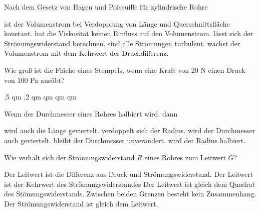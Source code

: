 \documentclass[11pt]{exam}
\begin{document}
\setlength{\voffset}{-0.5in}
\setlength{\headsep}{5pt}

\hspace{2mm}
 \hspace{5mm}
\vspace{4mm}

\begin{questions}

\question Nach dem Gesetz von Hagen und Poiseuille für zylindrische Rohre

\begin{choices}
	\choice ist der Volumenstrom bei Verdopplung von Länge und Querschnittsfläche konstant.
	\choice hat die Viskosität keinen Einfluss auf den Volumenstrom.
	\choice lässt sich der Strömungswiderstand berechnen.
	\choice sind alle Strömungen turbulent.
	\choice wächst der Volumenstrom mit dem Kehrwert der Druckdifferenz.
\end{choices}

\vspace{3mm}\question Wie groß ist die Fläche eines Stempels, wenn eine Kraft von 20 N einen Druck von 100 Pa ausübt?

\begin{choices}
	,5 qm
	,2 qm
	 qm
	 qm
	 qm
\end{choices}

\vspace{3mm}\question Wenn der Durchmesser eines Rohres halbiert wird, dann

\begin{choices}
	\choice wird auch die Länge geviertelt.
	\choice verdoppelt sich der Radius.
	\choice wird der Durchmesser auch geviertelt.
	\choice bleibt der Durchmesser unverändert.
	\choice wird der Radius halbiert.
\end{choices}

\vspace{3mm}\question Wie verhält sich der Strömungswiderstand \(R\) eines Rohres zum Leitwert \(G\)?

\begin{choices}
	\choice Der Leitwert ist die Differenz aus Druck und Strömungswiderstand.
	\choice Der Leitwert ist der Kehrwert des Strömungswiderstandes
	\choice Der Leitwert ist gleich dem Quadrat des Stömungswiderstands.
	\choice Zwischen beiden Grenzen besteht kein Zusammenhang.
	\choice Der Strömungswiderstand ist gleich dem Leitwert.
\end{choices}


\end{questions}
\end{document}
